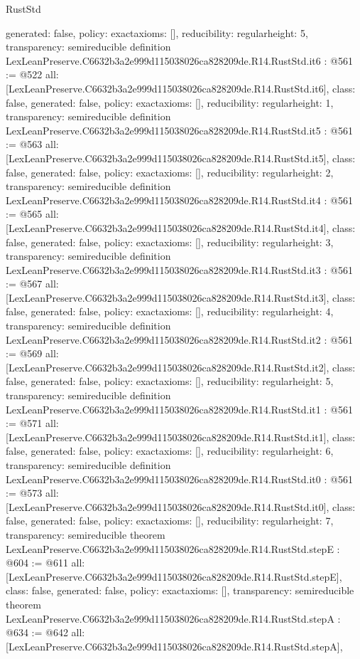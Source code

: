 \begin{lexlean}{RustStd}
\begin{coremodule}
{  generated: false,
  policy: exact{axioms: []},
  reducibility: regular{height: 5},
  transparency: semireducible
}
definition LexLeanPreserve.C6632b3a2e999d115038026ca828209de.R14.RustStd.it6 : @561 := @522 {
  all: [LexLeanPreserve.C6632b3a2e999d115038026ca828209de.R14.RustStd.it6],
  class: false,
  generated: false,
  policy: exact{axioms: []},
  reducibility: regular{height: 1},
  transparency: semireducible
}
definition LexLeanPreserve.C6632b3a2e999d115038026ca828209de.R14.RustStd.it5 : @561 := @563 {
  all: [LexLeanPreserve.C6632b3a2e999d115038026ca828209de.R14.RustStd.it5],
  class: false,
  generated: false,
  policy: exact{axioms: []},
  reducibility: regular{height: 2},
  transparency: semireducible
}
definition LexLeanPreserve.C6632b3a2e999d115038026ca828209de.R14.RustStd.it4 : @561 := @565 {
  all: [LexLeanPreserve.C6632b3a2e999d115038026ca828209de.R14.RustStd.it4],
  class: false,
  generated: false,
  policy: exact{axioms: []},
  reducibility: regular{height: 3},
  transparency: semireducible
}
definition LexLeanPreserve.C6632b3a2e999d115038026ca828209de.R14.RustStd.it3 : @561 := @567 {
  all: [LexLeanPreserve.C6632b3a2e999d115038026ca828209de.R14.RustStd.it3],
  class: false,
  generated: false,
  policy: exact{axioms: []},
  reducibility: regular{height: 4},
  transparency: semireducible
}
definition LexLeanPreserve.C6632b3a2e999d115038026ca828209de.R14.RustStd.it2 : @561 := @569 {
  all: [LexLeanPreserve.C6632b3a2e999d115038026ca828209de.R14.RustStd.it2],
  class: false,
  generated: false,
  policy: exact{axioms: []},
  reducibility: regular{height: 5},
  transparency: semireducible
}
definition LexLeanPreserve.C6632b3a2e999d115038026ca828209de.R14.RustStd.it1 : @561 := @571 {
  all: [LexLeanPreserve.C6632b3a2e999d115038026ca828209de.R14.RustStd.it1],
  class: false,
  generated: false,
  policy: exact{axioms: []},
  reducibility: regular{height: 6},
  transparency: semireducible
}
definition LexLeanPreserve.C6632b3a2e999d115038026ca828209de.R14.RustStd.it0 : @561 := @573 {
  all: [LexLeanPreserve.C6632b3a2e999d115038026ca828209de.R14.RustStd.it0],
  class: false,
  generated: false,
  policy: exact{axioms: []},
  reducibility: regular{height: 7},
  transparency: semireducible
}
theorem LexLeanPreserve.C6632b3a2e999d115038026ca828209de.R14.RustStd.stepE : @604 := @611 {
  all: [LexLeanPreserve.C6632b3a2e999d115038026ca828209de.R14.RustStd.stepE],
  class: false,
  generated: false,
  policy: exact{axioms: []},
  transparency: semireducible
}
theorem LexLeanPreserve.C6632b3a2e999d115038026ca828209de.R14.RustStd.stepA : @634 := @642 {
  all: [LexLeanPreserve.C6632b3a2e999d115038026ca828209de.R14.RustStd.stepA],
}
\end{coremodule}
\end{lexlean}
